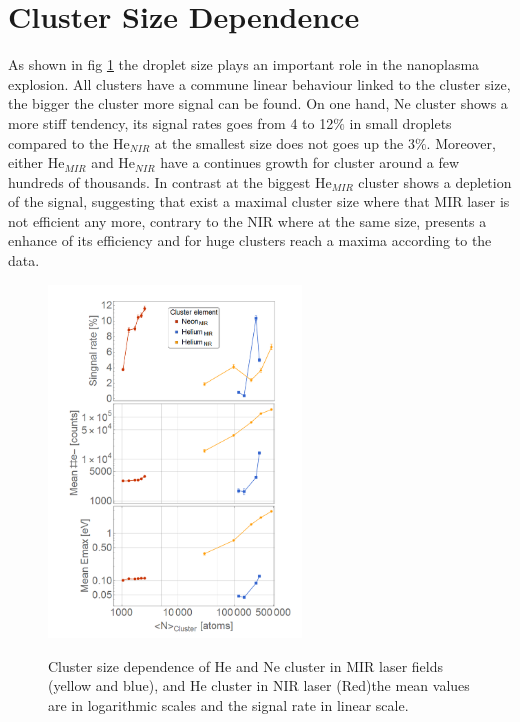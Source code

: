 \section{Cluster Size Dependence}

As shown in fig \ref{fig:elementall} the droplet size plays an important role in the nanoplasma explosion. All clusters have a commune linear behaviour linked to the cluster size, the bigger the cluster more signal can be found.  On one hand, Ne cluster shows a more stiff tendency, its signal rates goes from 4 to 12$\%$  in small droplets compared to the He$_{NIR}$ at the smallest size does not goes up the 3$\%$. Moreover, either He$_{MIR}$ and He$_{NIR}$ have a continues growth for cluster around a few hundreds of thousands. In contrast at the biggest He$_{MIR}$ cluster shows a depletion of the signal, suggesting that exist a maximal cluster size where that MIR laser is not efficient any more, contrary to the NIR where at the same size, presents a enhance of its efficiency and for huge clusters reach a maxima according to the data. 

\begin{figure}[h!]
\caption[Cluster size comparison]{ Cluster size dependence of He and Ne cluster in MIR laser fields (yellow and blue), and He cluster in NIR laser (Red)the mean values are in logarithmic scales and the signal rate in linear scale.}
\centering
\includegraphics[width=0.6\textwidth]{../Images/results/Comparison_energyDistribution/Comp_clusterSize.png}
\label{fig:elementall}
\end{figure}

